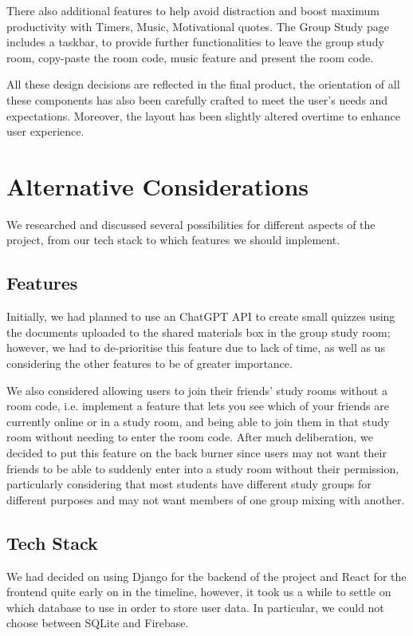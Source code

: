 There also additional features to help avoid distraction and boost maximum productivity with Timers, Music, Motivational quotes.
The Group Study page includes a taskbar, to provide further functionalities to leave the group study room, copy-paste the room code, music feature and present the room code.

All these design decisions are reflected in the final product, the orientation of all these components has also been carefully crafted to meet the user's needs and expectations. Moreover, the layout has been slightly altered overtime to enhance user experience.



\section{Alternative Considerations}
\label{sect:alternative-considerations}
We researched and discussed several possibilities for different aspects of the project, from our tech stack to which features we should implement.

\subsection{Features}
Initially, we had planned to use an ChatGPT API to create small quizzes using the documents uploaded to the shared materials box in the group study room; however, we had to de-prioritise this feature due to lack of time, as well as us considering the other features to be of greater importance.

We also considered allowing users to join their friends' study rooms without a room code, i.e. implement a feature that lets you see which of your friends are currently online or in a study room, and being able to join them in that study room without needing to enter the room code. After much deliberation, we decided to put this feature on the back burner since users may not want their friends to be able to suddenly enter into a study room without their permission, particularly considering that most students have different study groups for different purposes and may not want members of one group mixing with another.


\subsection{Tech Stack}
We had decided on using Django for the backend of the project and React for the frontend quite early on in the timeline, however, it took us a while to settle on which database to use in order to store user data. In particular, we could not choose between SQLite and Firebase.

